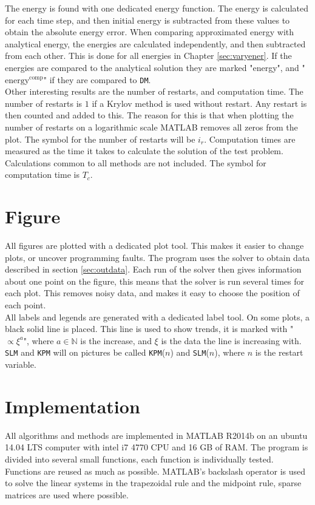 \noindent The energy is found with one dedicated energy function. The energy is calculated for each time step, and then initial energy is subtracted from these values to obtain the absolute energy error. When comparing approximated energy with analytical energy, the energies are calculated independently, and then subtracted from each other. This is done for all energies in Chapter \ref{sec:varyener}. If the energies are compared to the analytical solution they are marked "energy", and "$\text{energy}^{\text{comp}}$" if they are compared to \texttt{DM}.\\

\noindent Other interesting results are the number of restarts, and computation time.
The number of restarts is $1$ if a Krylov method is used without restart. Any restart is then counted and added to this. The reason for this is that when plotting the number of restarts on a logarithmic scale MATLAB removes all zeros from the plot. The symbol for the number of restarts will be $i_r$.
Computation times are measured as the time it takes to calculate the solution of the test problem. Calculations common to all methods are not included.
The symbol for computation time is $T_c$.  \\

\section{Figure}%
All figures are plotted with a dedicated plot tool. This makes it easier to change plots, or uncover programming faults. The program uses the solver to obtain data described in section \ref{sec:outdata}. Each run of the solver then gives information about one point on the figure, this means that the solver is run several times for each plot. This removes noisy data, and makes it easy to choose the position of each point. \\

\noindent All labels and legends are generated with a dedicated label tool.
On some plots, a black solid line is placed. This line is used to show trends, it is marked with "$\propto \xi^a$", where $a \in \mathbb{N}$ is the increase, and $\xi$ is the data the line is increasing with.
\texttt{SLM} and \texttt{KPM} will on pictures be called \texttt{KPM}($n$) and \texttt{SLM}($n$), where $n$ is the restart variable.




\section{Implementation} %
\label{sec:praktisk}
All algorithms and methods are implemented in MATLAB R2014b on an ubuntu 14.04 LTS computer with intel i7 4770 CPU and 16 GB of RAM. 
The program is divided into several small functions, each function is individually tested. Functions are reused as much as possible.
MATLAB's backslash operator is used to solve the linear systems in the trapezoidal rule and  the midpoint rule, sparse matrices are used where possible. \\

